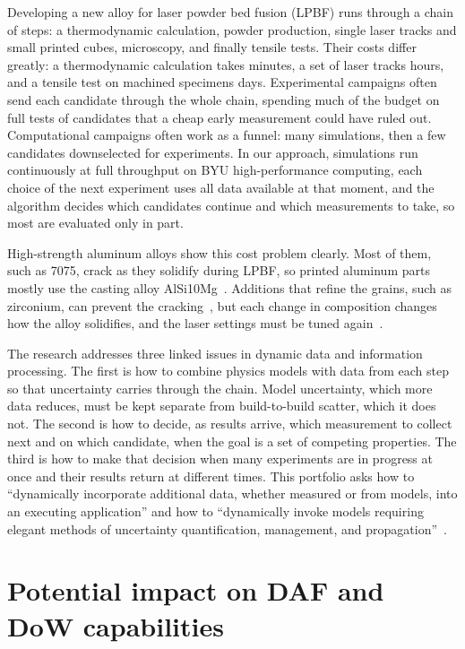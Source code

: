 \documentclass[12pt,letterpaper]{article}
\begin{document}
Developing a new alloy for laser powder bed fusion (LPBF) runs through a chain
of steps: a thermodynamic calculation, powder production, single laser tracks
and small printed cubes, microscopy, and finally tensile tests. Their costs
differ greatly: a thermodynamic calculation takes minutes, a set of laser
tracks hours, and a tensile test on machined specimens days. Experimental
campaigns often send each candidate through the whole chain, spending much of
the budget on full tests of candidates that a cheap early measurement could
have ruled out. Computational campaigns often work as a funnel: many
simulations, then a few candidates downselected for experiments. In our
approach, simulations run continuously at full throughput on BYU
high-performance computing, each choice of the next experiment uses all data
available at that moment, and the algorithm decides which candidates continue
and which measurements to take, so most are evaluated only in part.

High-strength aluminum alloys show this cost problem clearly. Most of them,
such as 7075, crack as they solidify during LPBF, so printed aluminum parts
mostly use the casting alloy AlSi10Mg~\cite{martin2017}. Additions that refine
the grains, such as zirconium, can prevent the cracking~\cite{martin2017}, but
each change in composition changes how the alloy solidifies, and the laser
settings must be tuned again~\cite{debroy2018}.

The research addresses three linked issues in dynamic data and information
processing. The first is how to combine physics models with data from each
step so that uncertainty carries through the chain. Model uncertainty, which
more data reduces, must be kept separate from build-to-build scatter, which
it does not. The second is how to decide, as results arrive, which
measurement to collect next and on which candidate, when the goal is a set of
competing properties. The third is how to make that decision when many
experiments are in progress at once and their results return at different
times. This portfolio asks how to ``dynamically
incorporate additional data, whether measured or from models, into an
executing application'' and how to ``dynamically invoke models requiring
elegant methods of uncertainty quantification, management, and
propagation''~\cite{baa2026}.

\section{Potential impact on DAF and DoW capabilities}
\end{document}
